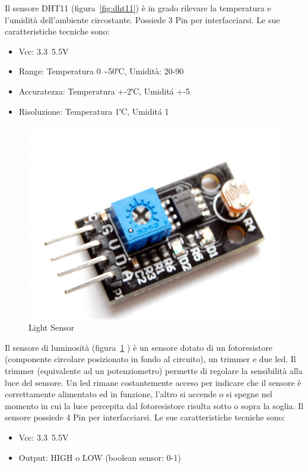  Il sensore DHT11 (figura~\ref{fig:dht11}) è in grado rilevare la temperatura e l'umidità dell'ambiente circostante. Possiede 3 Pin per interfacciarsi.
 Le sue caratteristiche tecniche sono:
 
 \begin{itemize}
 	\item Vcc: 3.3~5.5V
 	\item Range: Temperatura 0 \textasciitilde 50℃, Umidità:  20-90%
 	\item Accuratezza: Temperatura +-2℃, Umidit\'a +-5%
 	\item Risoluzione: Temperatura  1℃, Umidit\'a  1%
 \end{itemize}
 


\begin{figure}
	\centering
	\includegraphics[width=0.7\linewidth]{Figures/Sensors&Rasp/light}
	\caption[light]{Light Sensor}
	\label{fig:light}
\end{figure}

 Il sensore di luminosità (figura~\ref{fig:light} ) è un sensore dotato di un fotoresistore (componente circolare posizionato in fondo al circuito), un trimmer e due led. Il trimmer (equivalente ad un potenziometro) permette di regolare la sensibilità alla luce del sensore. Un led rimane costantemente acceso per indicare che il sensore è correttamente alimentato ed in funzione, l'altro si accende o si spegne nel momento in cui la luce percepita dal fotoresistore risulta sotto o sopra la soglia. Il sensore possiede 4 Pin per interfacciarsi.
 Le sue caratteristiche tecniche sono:
 
  \begin{itemize}
  	\item Vcc: 3.3~5.5V
  	\item Output: HIGH o LOW (boolean sensor: 0-1)
  \end{itemize}
  
